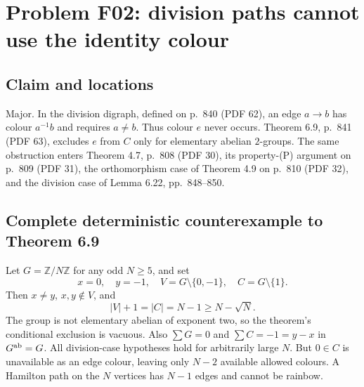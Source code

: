 \documentclass[10pt]{article}
\begin{document}
\section*{Problem F02: division paths cannot use the identity colour}
\subsection*{Claim and locations}
Major. In the division digraph, defined on p. 840 (PDF 62), an edge \(a\to b\) has colour \(a^{-1}b\) and requires \(a\neq b\). Thus colour \(e\) never occurs. Theorem 6.9, p. 841 (PDF 63), excludes \(e\) from \(C\) only for elementary abelian \(2\)-groups. The same obstruction enters Theorem 4.7, p. 808 (PDF 30), its property-(P) argument on p. 809 (PDF 31), the orthomorphism case of Theorem 4.9 on p. 810 (PDF 32), and the division case of Lemma 6.22, pp. 848–850.\par
\subsection*{Complete deterministic counterexample to Theorem 6.9}
Let \(G=\mathbb Z/N\mathbb Z\) for any odd \(N\geq5\), and set \[x=0,\quad y=-1,\quad V=G\setminus\{0,-1\},\quad C=G\setminus\{1\}.\] Then \(x\neq y\), \(x,y\notin V\), and \[|V|+1=|C|=N-1\geq N-\sqrt N.\] The group is not elementary abelian of exponent two, so the theorem’s conditional exclusion is vacuous. Also \(\sum G=0\) and \(\sum C=-1=y-x\) in \(G^{\rm ab}=G\). All division-case hypotheses hold for arbitrarily large \(N\). But \(0\in C\) is unavailable as an edge colour, leaving only \(N-2\) available allowed colours. A Hamilton path on the \(N\) vertices has \(N-1\) edges and cannot be rainbow.\par
\end{document}
